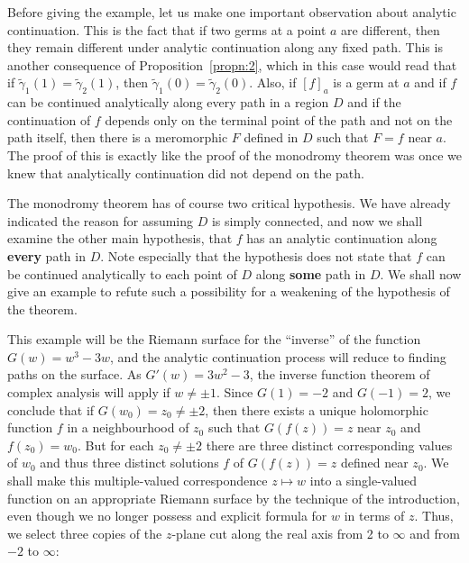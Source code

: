 \documentclass[a4paper,11pt]{article}
\begin{document}
Before giving the example, let us make one important observation about
analytic continuation.  This is the fact that if two germs at a point
$a$ are different, then they remain different under analytic
continuation along any fixed path.  This is another consequence of
Proposition~\ref{propn:2}, which in this case would read that if
$\widetilde{\gamma}_1(1) = \widetilde{\gamma}_2(1)$, then
$\widetilde{\gamma}_1(0) = \widetilde{\gamma}_2(0)$.  Also, if $[f]_a$
is a germ at $a$ and if $f$ can be continued analytically along every
path in a region $D$ and if the continuation of $f$ depends only on
the terminal point of the path and not on the path itself, then there
is a meromorphic $F$ defined in $D$ such that $F = f$ near $a$.  The
proof of this is exactly like the proof of the monodromy theorem was
once we knew that analytically continuation did not depend on the
path.

The monodromy theorem has of course two critical hypothesis.  We have
already indicated the reason for assuming $D$ is simply connected, and
now we shall examine the other main hypothesis, that $f$ has an
analytic continuation along \textbf{every} path in $D$.  Note
especially that the hypothesis does not state that $f$ can be
continued analytically to each point of $D$ along \textbf{some} path
in $D$.  We shall now give an example to refute such a possibility for
a weakening of the hypothesis of the theorem.

This example will be the Riemann surface for the ``inverse'' of the
function $G(w) = w^3 - 3w$, and the analytic continuation process will
reduce to finding paths on the surface.  As $G'(w) = 3w^2 - 3$, the
inverse function theorem of complex analysis will apply if $w \ne \pm
1$.  Since $G(1) = -2$ and $G(-1) = 2$, we conclude that if $G(w_0) =
z_0 \ne \pm 2$, then there exists a unique holomorphic function $f$ in
a neighbourhood of $z_0$ such that $G(f(z)) = z$ near $z_0$ and
$f(z_0) = w_0$.  But for each $z_0 \ne \pm 2$ there are three distinct
corresponding values of $w_0$ and thus three distinct solutions $f$ of
$G(f(z)) = z$ defined near $z_0$.  We shall make this multiple-valued
correspondence $z \mapsto w$ into a single-valued function on an
appropriate Riemann surface by the technique of the introduction, even
though we no longer possess and explicit formula for $w$ in terms of
$z$.  Thus, we select three copies of the $z$-plane cut along the real
axis from 2 to $\infty$ and from $-2$ to $\infty$:
\end{document}
